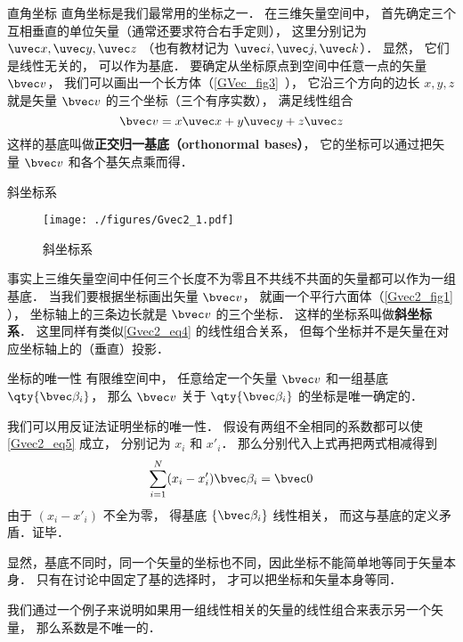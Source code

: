 \begin{example}{直角坐标}
直角坐标是我们最常用的坐标之一． 在三维矢量空间中， 首先确定三个互相垂直的单位矢量（通常还要求符合右手定则）， 这里分别记为 $\uvec x, \uvec y, \uvec z$ （也有教材记为 $\uvec i, \uvec j, \uvec k$）． 显然， 它们是线性无关的， 可以作为基底． 要确定从坐标原点到空间中任意一点的矢量 $\bvec v$， 我们可以画出一个长方体（\autoref{GVec_fig3}~）， 它沿三个方向的边长 $x, y, z$ 就是矢量 $\bvec v$ 的三个坐标（三个有序实数）， 满足线性组合
\begin{equation}\label{Gvec2_eq4}
\bvec v = x\uvec x + y\uvec y + z\uvec z
\end{equation}
这样的基底叫做\textbf{正交归一基底（orthonormal bases）}， 它的坐标可以通过把矢量 $\bvec v$ 和各个基矢点乘而得．
\end{example}

\begin{example}{斜坐标系}\label{Gvec2_ex1}
\begin{figure}[ht]
\centering
\texttt{[image: ./figures/Gvec2\_1.pdf]}
\caption{斜坐标系} \label{Gvec2_fig1}
\end{figure}
事实上三维矢量空间中任何三个长度不为零且不共线不共面的矢量都可以作为一组基底． 当我们要根据坐标画出矢量 $\bvec v$， 就画一个平行六面体（\autoref{Gvec2_fig1} ）， 坐标轴上的三条边长就是 $\bvec v$ 的三个坐标． 这样的坐标系叫做\textbf{斜坐标系}． 这里同样有类似\autoref{Gvec2_eq4} 的线性组合关系， 但每个坐标并不是矢量在对应坐标轴上的（垂直）投影．
\end{example}

\begin{theorem}{坐标的唯一性}
有限维空间中， 任意给定一个矢量 $\bvec v$ 和一组基底 $\qty{\bvec \beta_i}$， 那么 $\bvec v$ 关于 $\qty{\bvec \beta_i}$ 的坐标是唯一确定的．
\end{theorem}
我们可以用反证法证明坐标的唯一性． 假设有两组不全相同的系数都可以使\autoref{Gvec2_eq5} 成立， 分别记为 $x_i$ 和 $x'_i$． 那么分别代入上式再把两式相减得到
\begin{equation}
\sum_{i=1}^N (x_i-x'_i) \bvec \beta_i = \bvec 0
\end{equation}
由于 $(x_i-x'_i)$ 不全为零， 得基底 $\{\bvec \beta_i\}$ 线性相关， 而这与基底的定义矛盾．证毕．

显然，基底不同时，同一个矢量的坐标也不同，因此坐标不能简单地等同于矢量本身． 只有在讨论中固定了基的选择时， 才可以把坐标和矢量本身等同．

我们通过一个例子来说明如果用一组线性相关的矢量的线性组合来表示另一个矢量， 那么系数是不唯一的．

